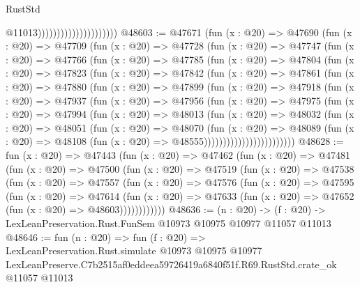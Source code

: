 \begin{lexlean}{RustStd}
\begin{coremodule}
                                              @11013)))))))))))))))))))))
@48603 := @47671
    (fun (x : @20) =>
    @47690
      (fun (x : @20) =>
      @47709
        (fun (x : @20) =>
        @47728
          (fun (x : @20) =>
          @47747
            (fun (x : @20) =>
            @47766
              (fun (x : @20) =>
              @47785
                (fun (x : @20) =>
                @47804
                  (fun (x : @20) =>
                  @47823
                    (fun (x : @20) =>
                    @47842
                      (fun (x : @20) =>
                      @47861
                        (fun (x : @20) =>
                        @47880
                          (fun (x : @20) =>
                          @47899
                            (fun (x : @20) =>
                            @47918
                              (fun (x : @20) =>
                              @47937
                                (fun (x : @20) =>
                                @47956
                                  (fun (x : @20) =>
                                  @47975
                                    (fun (x : @20) =>
                                    @47994
                                      (fun (x : @20) =>
                                      @48013
                                        (fun (x : @20) =>
                                        @48032
                                          (fun (x : @20) =>
                                          @48051
                                            (fun (x : @20) =>
                                            @48070
                                              (fun (x : @20) =>
                                              @48089
                                                (fun (x : @20) =>
                                                @48108
                                                  (fun (x : @20) => @48555))))))))))))))))))))))))
@48628 := fun (x : @20) =>
  @47443
    (fun (x : @20) =>
    @47462
      (fun (x : @20) =>
      @47481
        (fun (x : @20) =>
        @47500
          (fun (x : @20) =>
          @47519
            (fun (x : @20) =>
            @47538
              (fun (x : @20) =>
              @47557
                (fun (x : @20) =>
                @47576
                  (fun (x : @20) =>
                  @47595
                    (fun (x : @20) =>
                    @47614
                      (fun (x : @20) =>
                      @47633 (fun (x : @20) => @47652 (fun (x : @20) => @48603))))))))))))
@48636 := (n : @20) ->
  (f : @20) -> LexLeanPreservation.Rust.FunSem @10973 @10975 @10977 @11057 @11013
@48646 := fun (n : @20) =>
  fun (f : @20) =>
  LexLeanPreservation.Rust.simulate
    @10973
    @10975
    @10977
    LexLeanPreserve.C7b2515af0eddeea59726419a6840f51f.R69.RustStd.crate_ok
    @11057
    @11013
\end{coremodule}
\end{lexlean}
